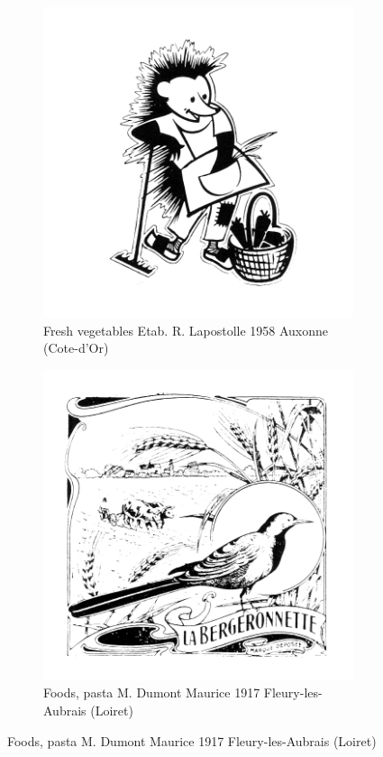 \begin{figure}[h]
  \begin{subfigure}{.45\textwidth}
    \centering
    \includegraphics[width=.5\linewidth]{images/supplement/trademarks/french/11_6}
    \caption[]{Fresh vegetables Etab. R. Lapostolle 1958 Auxonne (Cote-d'Or)}
    \label{fig:trademarks:french:11.6}
  \end{subfigure}\hfill
  \begin{subfigure}{.45\textwidth}
    \centering
    \includegraphics[width=.5\linewidth]{images/supplement/trademarks/french/12_1}
    \caption[]{Foods, pasta M. Dumont Maurice 1917 Fleury-les-Aubrais (Loiret)}
    \label{fig:trademarks:french:12.1}
  \end{subfigure}


\end{figure}
